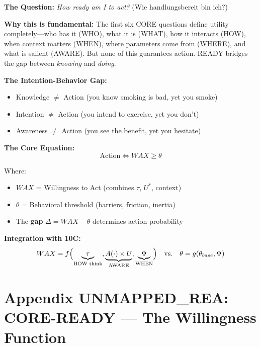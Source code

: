 \begin{tcolorbox}[colback=purple!5!white, colframe=purple!75!black,
    title=\textbf{CORE-READY: The Seventh Fundamental Question (10C)}]

\textbf{The Question:} \textit{How ready am I to act?} (Wie handlungsbereit bin ich?)

\textbf{Why this is fundamental:} The first six CORE questions define utility completely---who has it (WHO), what it is (WHAT), how it interacts (HOW), when context matters (WHEN), where parameters come from (WHERE), and what is salient (AWARE). But none of this guarantees action. READY bridges the gap between \textit{knowing} and \textit{doing}.

\textbf{The Intention-Behavior Gap:}
\begin{itemize}[nosep]
    \item Knowledge $\neq$ Action (you know smoking is bad, yet you smoke)
    \item Intention $\neq$ Action (you intend to exercise, yet you don't)
    \item Awareness $\neq$ Action (you see the benefit, yet you hesitate)
\end{itemize}

\textbf{The Core Equation:}
\[
\boxed{\text{Action} \Leftrightarrow WAX \geq \theta}
\]

Where:
\begin{itemize}[nosep]
    \item $WAX$ = Willingness to Act (combines $\tau$, $U^*$, context)
    \item $\theta$ = Behavioral threshold (barriers, friction, inertia)
    \item The \textbf{gap} $\Delta = WAX - \theta$ determines action probability
\end{itemize}

\textbf{Integration with 10C:}
\[
WAX = f\Bigl(\underbrace{\tau}_{\text{HOW think}}, \underbrace{A(\cdot) \times U}_{\text{AWARE}}, \underbrace{\Psi}_{\text{WHEN}}\Bigr) \quad \text{vs.} \quad \theta = g(\theta_{base}, \Psi)
\]

\end{tcolorbox}

\section*{Appendix UNMAPPED_REA: CORE-READY — The Willingness Function}
\label{app:core-ready}
\label{app:willingness-formalization}

